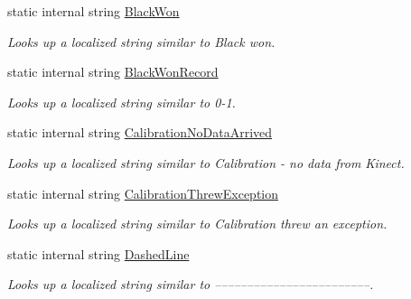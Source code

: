 \begin{DoxyCompactItemize}
static internal string \mbox{\hyperlink{class_chess_tracking_1_1_localization_1_1_program_localization_a47c975126f17b0f35073251ba26485bb}{Black\+Won}}
\begin{DoxyCompactList}\small\item\em Looks up a localized string similar to Black won. \end{DoxyCompactList}\item 
static internal string \mbox{\hyperlink{class_chess_tracking_1_1_localization_1_1_program_localization_ad25880e1fe1f82b747370e1f017caa9f}{Black\+Won\+Record}}
\begin{DoxyCompactList}\small\item\em Looks up a localized string similar to 0-\/1. \end{DoxyCompactList}\item 
static internal string \mbox{\hyperlink{class_chess_tracking_1_1_localization_1_1_program_localization_aca7e1592abddaa3f4dff88c519ba46ad}{Calibration\+No\+Data\+Arrived}}
\begin{DoxyCompactList}\small\item\em Looks up a localized string similar to Calibration -\/ no data from Kinect. \end{DoxyCompactList}\item 
static internal string \mbox{\hyperlink{class_chess_tracking_1_1_localization_1_1_program_localization_a15f399f46367cf63445f41c18e4cf764}{Calibration\+Threw\+Exception}}
\begin{DoxyCompactList}\small\item\em Looks up a localized string similar to Calibration threw an exception. \end{DoxyCompactList}\item 
static internal string \mbox{\hyperlink{class_chess_tracking_1_1_localization_1_1_program_localization_ab5a14a9d326a39123fa97e7c049a0796}{Dashed\+Line}}
\begin{DoxyCompactList}\small\item\em Looks up a localized string similar to ––––––––––––––––––––––––. \end{DoxyCompactList}\item 

\end{DoxyCompactItemize}
